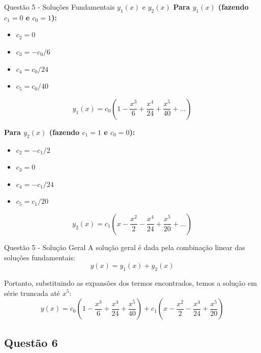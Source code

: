 \documentclass[8pt,aspectratio = 169]{beamer}
\begin{document}
\begin{frame}{Questão 5 - Soluções Fundamentais $y_1(x)$ e $y_2(x)$}
    \textbf{Para $y_1(x)$ (fazendo $c_1 = 0$ e $c_0 = 1$):}
    \begin{itemize}
        \item $c_2 = 0$
        \item $c_3 = -c_0/6$
        \item $c_4 = c_0/24$
        \item $c_5 = c_0/40$
    \end{itemize}
    \begin{equation*}
        y_1(x) = c_0 \left( 1 - \frac{x^3}{6} + \frac{x^4}{24} + \frac{x^5}{40} + \dots \right)
    \end{equation*}
    
    \vspace{0.3cm}
    \textbf{Para $y_2(x)$ (fazendo $c_1 = 1$ e $c_0 = 0$):}
    \begin{itemize}
        \item $c_2 = -c_1/2$
        \item $c_3 = 0$
        \item $c_4 = -c_1/24$
        \item $c_5 = c_1/20$
    \end{itemize}
    \begin{equation*}
        y_2(x) = c_1 \left( x - \frac{x^2}{2} - \frac{x^4}{24} + \frac{x^5}{20} + \dots \right)
    \end{equation*}
\end{frame}

\begin{frame}{Questão 5 - Solução Geral}
    A solução geral é dada pela combinação linear das soluções fundamentais:
    \begin{equation*}
        y(x) = y_1(x) + y_2(x)
    \end{equation*}
    
    Portanto, substituindo as expansões dos termos encontrados, temos a solução em série truncada até $x^5$:
    \begin{equation*}
        y(x) = c_0 \left( 1 - \frac{x^3}{6} + \frac{x^4}{24} + \frac{x^5}{40} \right) + c_1 \left( x - \frac{x^2}{2} - \frac{x^4}{24} + \frac{x^5}{20} \right)
    \end{equation*}
\end{frame}

\subsection{Questão 6}
\end{document}
